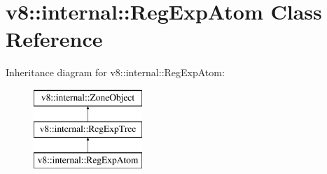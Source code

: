 \hypertarget{classv8_1_1internal_1_1_reg_exp_atom}{}\section{v8\+:\+:internal\+:\+:Reg\+Exp\+Atom Class Reference}
\label{classv8_1_1internal_1_1_reg_exp_atom}
Inheritance diagram for v8\+:\+:internal\+:\+:Reg\+Exp\+Atom\+:\begin{figure}[H]
\begin{center}
\leavevmode
\includegraphics[height=3.000000cm]{classv8_1_1internal_1_1_reg_exp_atom}
\end{center}
\end{figure}
